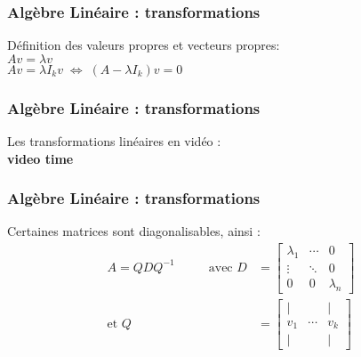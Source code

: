\documentclass{formation}
\begin{document}
\begin{frame}
  \frametitle{Algèbre Linéaire : transformations}
  Définition des valeurs propres et vecteurs propres:\\
  $Av = \lambda v$ \\
  $Av = \lambda I_k v \;\iff\; (A-\lambda I_k)v = 0$
\end{frame}

\begin{frame}
  \frametitle{Algèbre Linéaire : transformations}
  Les transformations linéaires en vidéo : \\
             {\textbf{video time}}
\end{frame}

\begin{frame}
  \frametitle{Algèbre Linéaire : transformations}
      Certaines matrices sont diagonalisables, ainsi :
      \begin{align*}
        A = Q D Q^{-1} \hspace{1cm} \mbox{ avec } D & =
        \begin{bmatrix}
          \lambda_1 & \cdots & 0 \\
          \vdots & \ddots & 0 \\
          0 & 0 & \lambda_n
        \end{bmatrix} \\[5mm]
        \mbox{et } Q & =
        \begin{bmatrix}
          \mid && \mid \\
          v_1 & \cdots & v_k \\
          \mid && \mid
        \end{bmatrix}
      \end{align*}
\end{frame}
\end{document}
